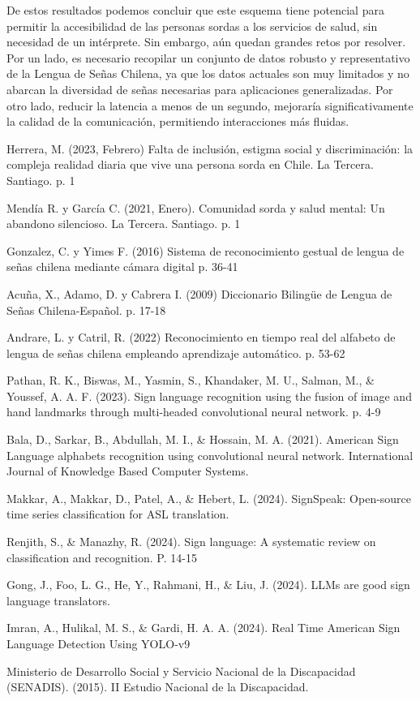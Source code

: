 \documentclass{article}
\begin{document}
De estos resultados podemos concluir que este esquema tiene potencial para permitir la accesibilidad de las personas sordas a los servicios de salud, sin necesidad de un intérprete. Sin embargo, aún quedan grandes retos por resolver. Por un lado, es necesario recopilar un conjunto de datos robusto y representativo de la Lengua de Señas Chilena, ya que los datos actuales son muy limitados y no abarcan la diversidad de señas necesarias para aplicaciones generalizadas. Por otro lado, reducir la latencia a menos de un segundo, mejoraría significativamente la calidad de la comunicación, permitiendo interacciones más fluidas.


\begin{thebibliography}{99}

  Herrera, M. (2023, Febrero) Falta de inclusión, estigma social y discriminación: la compleja realidad diaria que vive una persona sorda en Chile. La Tercera. Santiago. p. 1 

 Mendía R. y García C. (2021, Enero). Comunidad sorda y salud mental: Un abandono silencioso. La Tercera. Santiago. p. 1

 Gonzalez, C. y Yimes F. (2016) Sistema de reconocimiento gestual de lengua de señas chilena mediante cámara digital p. 36-41

 Acuña, X., Adamo, D. y Cabrera I. (2009) Diccionario Bilingüe de Lengua de Señas Chilena-Español. p. 17-18

 Andrare, L. y Catril, R. (2022) Reconocimiento en tiempo real del alfabeto de lengua de señas chilena empleando aprendizaje automático. p. 53-62

 Pathan, R. K., Biswas, M., Yasmin, S., Khandaker, M. U., Salman, M., \& Youssef, A. A. F. (2023). Sign language recognition using the fusion of image and hand landmarks through multi-headed convolutional neural network. p. 4-9

  Bala, D., Sarkar, B., Abdullah, M. I., \& Hossain, M. A. (2021). American Sign Language alphabets recognition using convolutional neural network. International Journal of Knowledge Based Computer Systems.

  Makkar, A., Makkar, D., Patel, A., \& Hebert, L. (2024). SignSpeak: Open-source time series classification for ASL translation.

  Renjith, S., \& Manazhy, R. (2024). Sign language: A systematic review on classification and recognition. P. 14-15

 Gong, J., Foo, L. G., He, Y., Rahmani, H., \& Liu, J. (2024). LLMs are good sign language translators. 

 Imran, A., Hulikal, M. S., \& Gardi, H. A. A. (2024). Real Time American Sign Language Detection Using YOLO-v9

 Ministerio de Desarrollo Social y Servicio Nacional de la Discapacidad (SENADIS). (2015). II Estudio Nacional de la Discapacidad.


\end{thebibliography}
\end{document}
